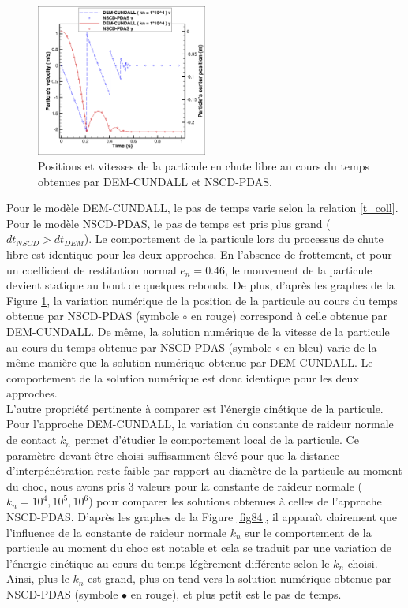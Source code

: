 \begin{figure}[!h]
  \centering
    \includegraphics[width=0.5\textwidth]{chapitres/chapitre_4/figures/vel-pos-y_chute-libre.png}
    \caption{\centering Positions et vitesses de la particule en chute libre au cours du temps obtenues par DEM-CUNDALL et NSCD-PDAS.}\label{fig74}
\end{figure}

Pour le modèle DEM-CUNDALL, le pas de temps varie selon la relation \ref{t_coll}. Pour le modèle NSCD-PDAS, le pas de temps est pris plus grand ($dt_{NSCD}>dt_{DEM}$). Le comportement de la particule lors du processus de chute libre est identique pour les deux approches. En l'absence de frottement, et pour un coefficient de restitution normal $e_n = 0.46$, le mouvement de la particule devient statique au bout de quelques rebonds. De plus, d'après les graphes de la Figure \ref{fig74}, la variation numérique de la position de la particule au cours du temps obtenue par NSCD-PDAS (symbole $\circ$ en rouge) correspond à celle obtenue par DEM-CUNDALL. De même, la solution numérique de la vitesse de la particule au cours du temps obtenue par NSCD-PDAS (symbole $\circ$ en bleu) varie de la même manière que la solution numérique obtenue par DEM-CUNDALL. Le comportement de la solution numérique est donc identique pour les deux approches.\\

L'autre propriété pertinente à comparer est l'énergie cinétique de la particule. Pour l'approche DEM-CUNDALL, la variation du constante de raideur normale de contact $k_n$ permet d'étudier le comportement local de la particule. Ce paramètre devant être choisi suffisamment élevé pour que la distance d'interpénétration reste faible par rapport au diamètre de la particule au moment du choc, nous avons pris 3 valeurs pour la constante de raideur normale ($k_n = 10^4, 10^5, 10^6$) pour comparer les solutions obtenues à celles de l'approche NSCD-PDAS. D'après les graphes de la Figure \ref{fig84}, il apparaît clairement que l'influence de la constante de raideur normale $k_n$ sur le comportement de la particule au moment du choc est notable et cela se traduit par une variation de l'énergie cinétique au cours du temps légèrement différente selon le $k_n$ choisi. Ainsi, plus le $k_n$ est grand, plus on tend vers la solution numérique obtenue par NSCD-PDAS (symbole $\bullet$ en rouge), et plus petit est le pas de temps.

